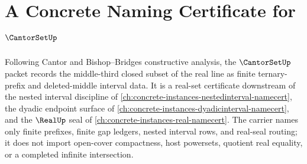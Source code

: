 \chapter{A Concrete Naming Certificate for $\CantorSetUp$}
\label{ch:concrete-instances-cantorset-namecert}

Following Cantor and Bishop--Bridges constructive analysis, the $\CantorSetUp$ packet records the middle-third closed subset of the real line as finite ternary-prefix and deleted-middle interval data. It is a real-set certificate downstream of the nested interval discipline of \autoref{ch:concrete-instances-nestedinterval-namecert}, the dyadic endpoint surface of \autoref{ch:concrete-instances-dyadicinterval-namecert}, and the $\RealUp$ seal of \autoref{ch:concrete-instances-real-namecert}. The carrier names only finite prefixes, finite gap ledgers, nested interval rows, and real-seal routing; it does not import open-cover compactness, host powersets, quotient real equality, or a completed infinite intersection.

